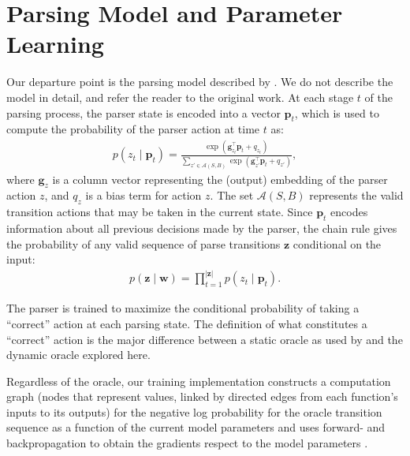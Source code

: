 \documentclass[11pt]{article}
\begin{document}
\section{Parsing Model and Parameter Learning}
Our departure point is the parsing model described by
.
We do not describe the model in detail, and refer the reader to the original
work.
At each stage $t$ of the parsing process, the parser state is encoded into a vector
$\mathbf{p}_t$, which is used to compute the probability of the parser action at
time $t$ as:
\begin{align}
p(z_t \mid \mathbf{p}_t) = \frac{\exp \left( \mathbf{g}_{z_t}^{\top}
\mathbf{p}_t + q_{z_t} \right)}{\sum_{z' \in \mathcal{A}(S,B)} \exp \left(
\mathbf{g}_{z'}^{\top} \mathbf{p}_t + q_{z'} \right)},
\label{eq:local-objective}
\end{align}
where $\mathbf{g}_z$ is a column vector representing the (output) embedding of
the parser action $z$, and $q_z$ is a bias term for action $z$. The set
$\mathcal{A}(S,B)$ represents the valid transition actions that may be taken in
the current state.
Since $\mathbf{p}_t$ encodes information about all
previous decisions made by the parser, the chain rule gives
the probability of any valid sequence of parse transitions $\boldsymbol{z}$ conditional on the input:
\begin{align}
p(\boldsymbol{z} \mid \boldsymbol{w}) = \prod_{t=1}^{|\boldsymbol{z}|} p(z_t \mid \mathbf{p}_t). \label{eq:objective}
\end{align}



The parser is trained to maximize the conditional probability of taking a
``correct'' action at each parsing state.  The definition of what
constitutes a ``correct'' action is the major difference between a static oracle
as used by  and the dynamic oracle explored here.

Regardless of the oracle, our training implementation constructs a
computation graph (nodes that represent values, linked by directed
edges from each function's inputs to its outputs) for the negative log
probability for the oracle transition sequence as a function of the current
model parameters and uses forward- and
backpropagation to obtain the gradients respect to the model parameters
\cite[section 4]{lecun:1998}. 
\end{document}
